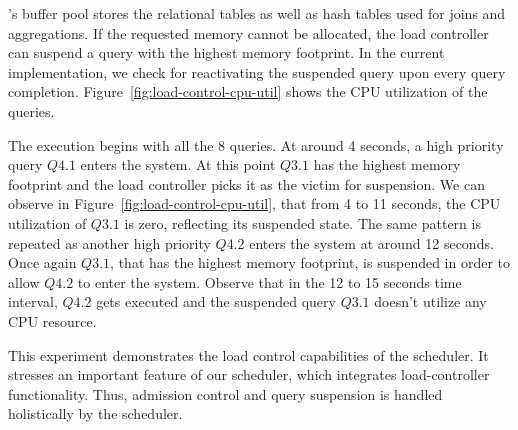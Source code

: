 \sys{}'s buffer pool stores the relational tables as well as hash tables used for joins and aggregations.
If the requested memory cannot be allocated, the load controller can suspend a query with the highest memory footprint. 
In the current implementation, we check for reactivating the suspended query upon every query completion. %
Figure~\ref{fig:load-control-cpu-util} shows the CPU utilization of the queries.

The execution begins with all the 8 queries.
At around 4 seconds, a high priority query $Q4.1$ enters the system.
At this point $Q3.1$ has the highest memory footprint and the load controller
picks it as the victim for suspension.
We can observe in Figure~\ref{fig:load-control-cpu-util}, that from 4 to 11 seconds, the CPU utilization of $Q3.1$ is zero, reflecting its suspended state.
The same pattern is repeated as another high priority $Q4.2$ enters the system at around 12 seconds.
Once again $Q3.1$, that has the highest memory footprint, is suspended in order to allow $Q4.2$ to enter the system. 
Observe that in the 12 to 15 seconds time interval, $Q4.2$ gets executed and the suspended query $Q3.1$ doesn't utilize any CPU resource.

This experiment demonstrates the load control capabilities of the \sys{}
scheduler. 
It stresses an important feature of our scheduler, which integrates load-controller functionality. %
Thus, admission control and query suspension is handled holistically by the scheduler. 